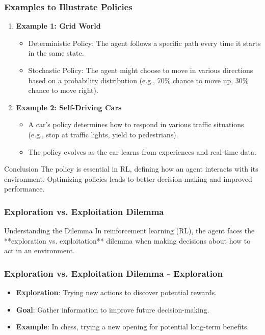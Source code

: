 \documentclass{beamer}
\begin{document}
\begin{frame}[fragile]
    \frametitle{Examples to Illustrate Policies}

    \begin{enumerate}
        \item \textbf{Example 1: Grid World}
            \begin{itemize}
                \item Deterministic Policy: The agent follows a specific path every time it starts in the same state.
                \item Stochastic Policy: The agent might choose to move in various directions based on a probability distribution (e.g., 70\% chance to move up, 30\% chance to move right).
            \end{itemize}
        \item \textbf{Example 2: Self-Driving Cars}
            \begin{itemize}
                \item A car's policy determines how to respond in various traffic situations (e.g., stop at traffic lights, yield to pedestrians).
                \item The policy evolves as the car learns from experiences and real-time data.
            \end{itemize}
    \end{enumerate}
    
    \begin{block}{Conclusion}
        The policy is essential in RL, defining how an agent interacts with its environment. Optimizing policies leads to better decision-making and improved performance.
    \end{block}
\end{frame}

\begin{frame}[fragile]
    \frametitle{Exploration vs. Exploitation Dilemma}
    \begin{block}{Understanding the Dilemma}
        In reinforcement learning (RL), the agent faces the **exploration vs. exploitation** dilemma when making decisions about how to act in an environment.
    \end{block}
\end{frame}

\begin{frame}[fragile]
    \frametitle{Exploration vs. Exploitation Dilemma - Exploration}
    \begin{itemize}
        \item \textbf{Exploration}: Trying new actions to discover potential rewards.
        \item \textbf{Goal}: Gather information to improve future decision-making.
        \item \textbf{Example}: In chess, trying a new opening for potential long-term benefits.
    \end{itemize}
\end{frame}
\end{document}
